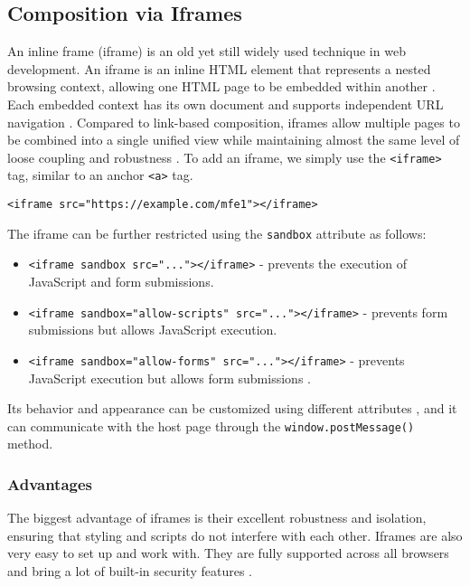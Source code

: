 \subsection{Composition via Iframes}
An inline frame (iframe) is an old yet still widely used technique in web development. An iframe is an inline HTML element that represents a nested browsing context, allowing one HTML page to be embedded within another \cite{iFrame}. Each embedded context has its own document and supports independent URL navigation \cite{iFrame}. Compared to link-based composition, iframes allow multiple pages to be combined into a single unified view while maintaining almost the same level of loose coupling and robustness \cite{MezzaliraBuildingMf}. To add an iframe, we simply use the \texttt{<iframe>} tag, similar to an anchor \texttt{<a>} tag.
\begin{lstlisting}[caption={Example of embedding a microfrontend using an iframe}]
  <iframe src="https://example.com/mfe1"></iframe>
\end{lstlisting}
The iframe can be further restricted using the \texttt{sandbox} attribute as follows:
\begin{itemize}
    \item \texttt{<iframe sandbox src="..."></iframe>} - prevents the execution of JavaScript and form submissions.
    \item \texttt{<iframe sandbox="allow-scripts" src="..."></iframe>} - prevents form submissions but allows JavaScript execution.
    \item \texttt{<iframe sandbox="allow-forms" src="..."></iframe>} - prevents JavaScript execution but allows form submissions \cite{MezzaliraBuildingMf}.
\end{itemize}
Its behavior and appearance can be customized using different attributes \cite{iFrame}, and it can communicate with the host page through the \texttt{window.postMessage()} method.

\subsubsection{Advantages}
The biggest advantage of iframes is their excellent robustness and isolation, ensuring that styling and scripts do not interfere with each other. Iframes are also very easy to set up and work with. They are fully supported across all browsers and bring a lot of built-in security features \cite{Geers, Jackson, MezzaliraBuildingMf}.

